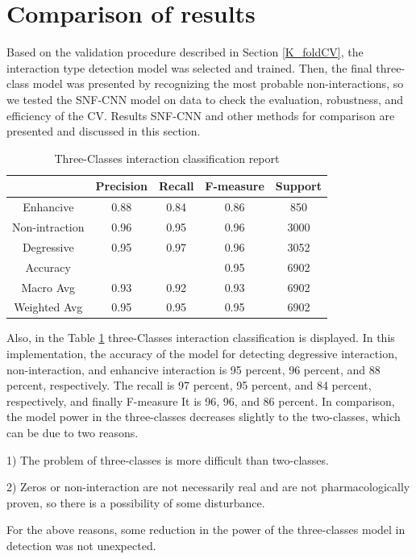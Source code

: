 \documentclass{bmcart}
\begin{document}
\section*{Comparison of results}
Based on the validation procedure described in Section
\ref{K_foldCV}, the interaction type detection model was selected and trained. Then, the final three-class model was presented by recognizing the most probable non-interactions, so we tested the SNF-CNN model on data to check the evaluation, robustness, and efficiency of the CV. Results SNF-CNN and other methods for comparison are presented and discussed in this section. 

\begin{table}[h!]
\centering
\begin{tabular}{|c|c|c|c|c|}
\hline
& Precision & Recall & F-measure & Support  \\
\hline
Enhancive & 0.88 & 0.84 & 0.86 & 850\\
\hline
Non-intraction & 0.96 & 0.95 & 0.96 & 3000\\
\hline
Degressive & 0.95 & 0.97 & 0.96 & 3052\\
\hline
Accuracy &  & & 0.95 &6902\\
\hline
Macro Avg & 0.93 & 0.92 & 0.93 & 6902 \\
\hline
Weighted Avg & 0.95 & 0.95 &0.95 & 6902\\
\hline
\end{tabular}
\newline
	\caption{Three-Classes interaction classification report}
	\label{TripleclassificatonReport}
\end{table}

Also, in the Table \ref{TripleclassificatonReport} three-Classes interaction classification is displayed. In this implementation, the accuracy of the model for detecting degressive interaction, non-interaction, and enhancive interaction is 95 percent, 96 percent, and 88 percent, respectively. The recall is 97 percent, 95 percent, and 84 percent, respectively, and finally F-measure It is 96, 96, and 86 percent. In comparison, the model power in the three-classes decreases slightly to the two-classes, which can be due to two reasons.

1) The problem of three-classes is more difficult than two-classes.

2) Zeros or non-interaction are not necessarily real and are not pharmacologically proven, so there is a possibility of some disturbance.

For the above reasons, some reduction in the power of the three-classes model in detection was not unexpected.
\end{document}
